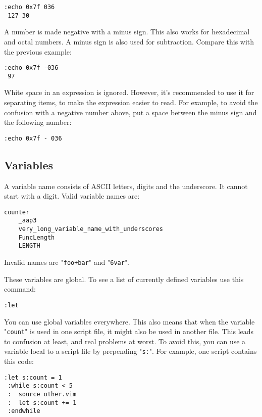 \begin{Verbatim}[samepage=true]
 :echo 0x7f 036
 127 30
\end{Verbatim}

A number is made negative with a minus sign.
This also works for hexadecimal and octal numbers.
A minus sign is also used for subtraction.
Compare this with the previous example:

\begin{Verbatim}[samepage=true]
 :echo 0x7f -036
 97
\end{Verbatim}

White space in an expression is ignored.
However, it's recommended to use it for separating items, to make the expression easier to read.
For example, to avoid the confusion with a negative number above, put a space between the minus sign and the following number:

\begin{Verbatim}[samepage=true]
 :echo 0x7f - 036
\end{Verbatim}
\subsection{Variables}
A variable name consists of ASCII letters, digits and the underscore.
It cannot start with a digit.
Valid variable names are:

\begin{Verbatim}[samepage=true]
    counter
    _aap3
    very_long_variable_name_with_underscores
    FuncLength
    LENGTH
\end{Verbatim}

Invalid names are "\verb!foo+bar!" and "\verb!6var!".

These variables are global.
To see a list of currently defined variables use this command:

\begin{Verbatim}[samepage=true]
 :let
\end{Verbatim}

You can use global variables everywhere.
This also means that when the variable "\verb!count!" is used in one script file, it might also be used in another file.
This leads to confusion at least, and real problems at worst.
To avoid this, you can use a variable local to a script file by prepending "\verb!s:!".
For example, one script contains this code:

\begin{Verbatim}[samepage=true]
 :let s:count = 1
 :while s:count < 5
 :  source other.vim
 :  let s:count += 1
 :endwhile
\end{Verbatim}

